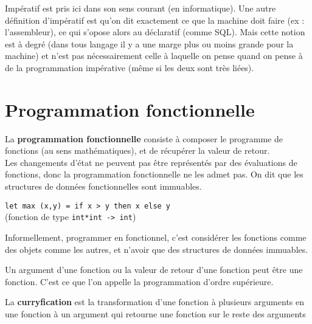 \begin{rem}
	Impératif est pris ici dans son sens courant (en informatique). Une autre définition d'impératif est qu'on dit exactement ce que la machine doit faire (ex : l'assembleur), ce qui s'opose alors au déclaratif (comme SQL). Mais cette notion est à degré (dans tous langage il y a une marge plus ou moins grande pour la machine) et n'est pas nécessairement celle à laquelle on pense quand on pense à de la programmation impérative (même si les deux sont très liées).
\end{rem}

\section{Programmation fonctionnelle}

\begin{definition}
	La \textbf{programmation fonctionnelle} consiste à composer le programme de fonctions
	(au sens mathématiques), et de récupérer la valeur de retour.\\
	Les changements d'état ne peuvent pas être représentés par des évaluations de fonctions, donc la programmation fonctionnelle ne les admet pas. On dit que les structures de données fonctionnelles sont immuables.
\end{definition}

\begin{example}
		\lstinline|let max (x,y) = if x > y then x else y| \\ (fonction de type \lstinline|int*int -> int|) \label{2-1}
\end{example}

Informellement, programmer en fonctionnel, c'est considérer les fonctions comme des objets comme les autres, et n'avoir que des structures de données immuables.

\begin{rem}
	Un argument d'une fonction ou la valeur de retour d'une fonction peut être une fonction. C'est ce que l'on appelle la  programmation d'ordre supérieure.
\end{rem}


\begin{definition}
	La \textbf{curryfication} est la transformation d'une fonction à plusieurs arguments en une fonction à un argument qui retourne une fonction sur le reste des arguments
\end{definition}

